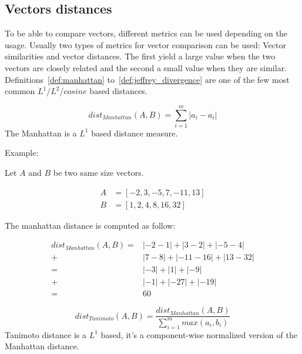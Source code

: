 \subsection{Vectors distances \label{sec:vectors_distances}}

To be able to compare vectors, different metrics can be used depending on the usage.
Usually two types of metrics for vector comparison can be used: Vector similarities and vector distances.
The first yield a large value when the two vectors are closely related and the second a small value when they are similar.
Definitions~\ref{def:manhattan} to~\ref{def:jeffrey_divergence} are one of the few most common $L^1$/$L^2$/$cosine$ based distances.

\begin{definition}
  \begin{equation}
    dist_{Manhattan}(A, B) = \sum_{i=1}^{m} |a_i - a_i|
  \end{equation}
  The Manhattan is a $L^1$ based distance measure.

  Example:

  Let $A$ and $B$ be two same size vectors.

  \begin{equation*}
    \begin{aligned}
      A &= \left[-2, 3, -5, 7, -11, 13 \right] \\
      B &= \left[1, 2, 4, 8, 16, 32 \right]
    \end{aligned}
  \end{equation*}

  The manhattan distance is computed as follow:

  \begin{equation*}
    \begin{aligned}
      dist_{Manhattan}(A, B) =& |-2 - 1| + |3 - 2| + |-5 - 4| \\
                             +& |7 - 8| + |-11 - 16| + |13 - 32| \\
                             =& |-3| + |1| + |-9| \\
                             +& |-1| + |-27| + |-19| \\
                             =& 60
    \end{aligned}
  \end{equation*}
\end{definition}

\begin{definition}
  \begin{equation}
    dist_{Tanimoto}(A, B) = \frac{dist_{Manhattan}(A, B)}{\sum_{i=1}^{m} max(a_i, b_i)}
  \end{equation}
  Tanimoto distance is a $L^1$ based, it's a component-wise normalized version of the Manhattan distance.
\end{definition}

